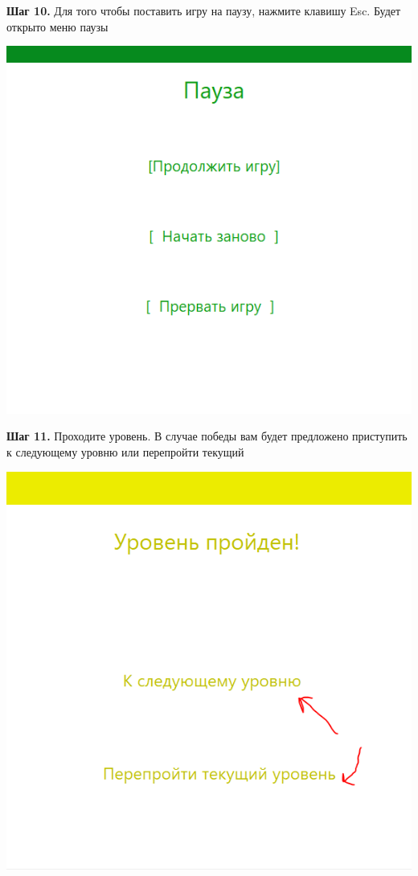 \documentclass[a4paper,14pt]{extarticle}
\begin{document}
\textbf{Шаг 10.} Для того чтобы поставить игру на паузу, нажмите клавишу Esc. Будет открыто меню паузы
\begin{center}
\includegraphics[scale=.9]{img10}
\end{center}

\textbf{Шаг 11.} Проходите уровень. В случае победы вам будет предложено приступить к следующему уровню или перепройти текущий
\begin{center}
\includegraphics[scale=.9]{img11}
\end{center}
\end{document}
